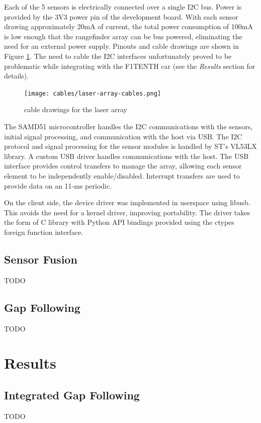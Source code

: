 \documentclass[conference]{IEEEtran}
\begin{document}
Each of the 5 sensors is electrically connected over a single I2C bus. Power is
provided by the 3V3 power pin of the development board. With each sensor
drawing approximately 20mA of current, the total power consumption of 100mA is
low enough that the rangefinder array can be bus powered, eliminating the need
for an external power supply. Pinouts and cable drawings are shown in Figure
\ref{fig:cable-drawings}. The need to cable the I2C interfaces unfortunately
proved to be problematic while integrating with the F1TENTH car (see the
\textit{Results} section for details).

\begin{figure}
\centering
\texttt{[image: cables/laser-array-cables.png]}
\caption{cable drawings for the laser array}
\label{fig:cable-drawings}
\end{figure}

The SAMD51 microcontroller handles the I2C communications with the sensors,
initial signal processing, and communication with the host via USB. The I2C
protocol and signal processing for the sensor modules is handled by ST's VL53LX
library. A custom USB driver handles communications with the host. The USB
interface provides control transfers to manage the array, allowing each sensor
element to be independently enable/disabled. Interrupt transfers are used to
provide data on an 11-ms periodic.

\FloatBarrier

On the client side, the device driver was implemented in userspace using
libusb. This avoids the need for a kernel driver, improving portability. The
driver takes the form of C library with Python API bindings provided using
the ctypes foreign function interface.

\subsection{Sensor Fusion}
TODO

\subsection{Gap Following}
TODO

\section{Results}
\subsection{Integrated Gap Following}
TODO
\end{document}

